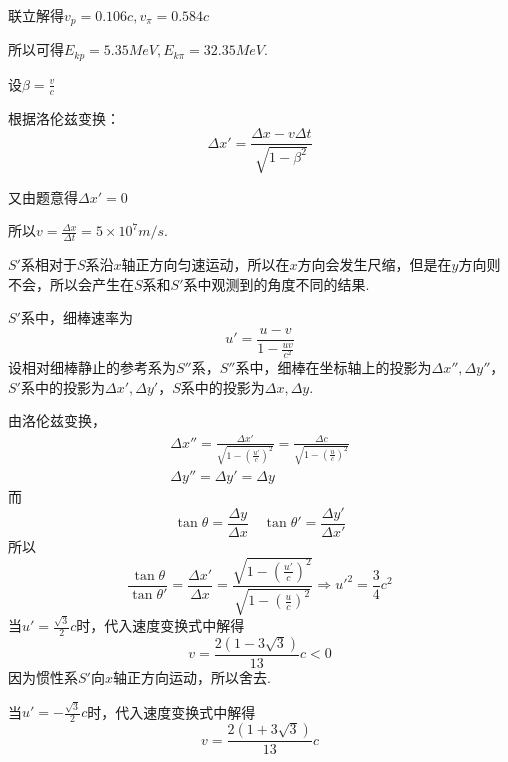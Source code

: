 \documentclass[b5paper,opensource,sourcefont,parskip]{qyxf-book}
\begin{document}
联立解得$v_p=0.106c,v_\pi=0.584c$

所以可得$E_{kp}=5.35MeV,E_{k\pi}=32.35MeV$.


\solve 
设$\beta=\frac{v}{c}$

根据洛伦兹变换：
\begin{equation*}
\Delta x'=\frac{\Delta x-v\Delta t}{\sqrt{1-\beta^2}}
\end{equation*}

又由题意得$\Delta x'=0$

所以$v=\frac{\Delta x}{\Delta t}=5\times10^7m/s$.


\analysis
$S'$系相对于$S$系沿$x$轴正方向匀速运动，所以在$x$方向会发生尺缩，但是在$y$方向则不会，所以会产生在$S$系和$S'$系中观测到的角度不同的结果.

\solve
$S'$系中，细棒速率为
\begin{equation*}
u'=\frac{u-v}{1-\frac{uv}{c^2}}
\end{equation*}
设相对细棒静止的参考系为$S''$系，$S''$系中，细棒在坐标轴上的投影为$\Delta x'',\Delta y''$，$S'$系中的投影为$\Delta x',\Delta y'$，$S$系中的投影为$\Delta x,\Delta y$.

由洛伦兹变换，
\begin{align*}
\Delta x''=\frac{\Delta x'}{\sqrt{1-(\frac{u'}{c})^2}}=\frac{\Delta c}{\sqrt{1-(\frac{u}{c})^2}}\\\Delta y''=\Delta y'=\Delta y
\end{align*}
而
\begin{equation*}
\tan{\theta}=\frac{\Delta y}{\Delta x}\quad \tan{\theta'}=\frac{\Delta y'}{\Delta x'}
\end{equation*}
所以
\begin{equation*}
\frac{\tan{\theta}}{\tan{\theta'}}=\frac{\Delta x'}{\Delta x}=\frac{\sqrt{1-(\frac{u'}{c})^2}}{\sqrt{1-(\frac{u}{c})^2}}\Rightarrow u'^2=\frac{3}{4}c^2
\end{equation*}
当$u'=\frac{\sqrt{3}}{2}c$时，代入速度变换式中解得
\begin{equation*}
v=\frac{2(1-3\sqrt{3})}{13}c<0
\end{equation*}
因为惯性系$S'$向$x$轴正方向运动，所以舍去.

当$u'=-\frac{\sqrt{3}}{2}c$时，代入速度变换式中解得
\begin{equation*}
v=\frac{2(1+3\sqrt{3})}{13}c
\end{equation*}

\end{document}
